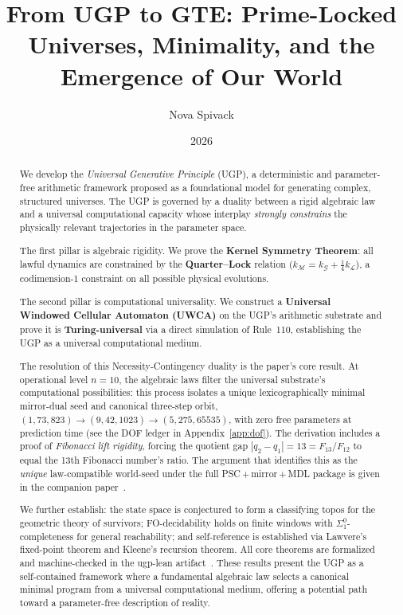 \documentclass[12pt]{article}
\title{From UGP to GTE: Prime-Locked Universes, Minimality, and the Emergence of Our World}
\author{Nova Spivack}
\date{2026}
\numberwithin{equation}{section}
\newcommand{\M}{\mathcal{M}}
\newcommand{\G}{\mathcal{G}}
\newcommand{\LL}{\mathcal{L}}
\begin{document}
\sloppy\setlength{\hfuzz}{15pt}

\maketitle
\NovaZenodoAfterTitle

\thispagestyle{empty}
\enlargethispage{2\baselineskip}
\begin{abstract}
We develop the \emph{Universal Generative Principle} (UGP), a deterministic and parameter-free arithmetic framework proposed as a foundational model for generating complex, structured universes. The UGP is governed by a duality between a rigid algebraic law and a universal computational capacity whose interplay \emph{strongly constrains} the physically relevant trajectories in the parameter space.

The first pillar is algebraic rigidity. We prove the \textbf{Kernel Symmetry Theorem}: all lawful dynamics are constrained by the \textbf{Quarter--Lock} relation ($k_{\M} = k_{\G} + \tfrac{1}{4}k_{\LL}$), a codimension-1 constraint on all possible physical evolutions.

The second pillar is computational universality. We construct a \textbf{Universal Windowed Cellular Automaton (UWCA)} on the UGP's arithmetic substrate and prove it is \textbf{Turing-universal} via a direct simulation of Rule~110, establishing the UGP as a universal computational medium.

The resolution of this Necessity-Contingency duality is the paper's core result. At operational level $n=10$, the algebraic laws filter the universal substrate's computational possibilities: this process isolates a unique lexicographically minimal mirror-dual seed and canonical three-step orbit, $(1,73,823) \to (9,42,1023) \to (5,275,65535)$, with zero free parameters at prediction time (see the DOF ledger in Appendix~\ref{app:dof}). The derivation includes a proof of \emph{Fibonacci lift rigidity}, forcing the quotient gap $|q_2-q_1|=13 = F_{13}/F_{12}$ to equal the 13th Fibonacci number's ratio. The argument that identifies this as the \emph{unique} law-compatible world-seed under the full PSC\,+\,mirror\,+\,MDL package is given in the companion paper~\cite{SpivackUGPUniqueness}.

We further establish: the state space is conjectured to form a classifying topos for the geometric theory of survivors; FO-decidability holds on finite windows with $\Sigma^0_1$-completeness for general reachability; and self-reference is established via Lawvere's fixed-point theorem and Kleene's recursion theorem. All core theorems are formalized and machine-checked in the ugp-lean artifact~\cite{SpivackUGPFormalization,ugp-lean}. These results present the UGP as a self-contained framework where a fundamental algebraic law selects a canonical minimal program from a universal computational medium, offering a potential path toward a parameter-free description of reality.
\end{abstract}
\end{document}
